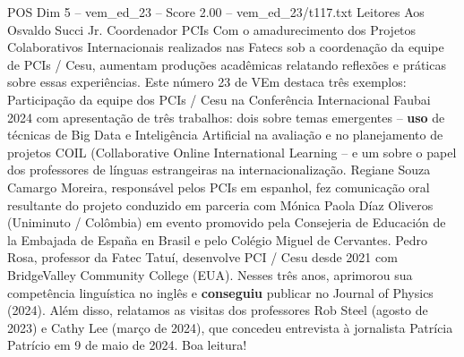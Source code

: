 \begin{textsample}{POS Dim 5 – vem\_ed\_23 – Score 2.00 – vem\_ed\_23/t117.txt}  \label{ex:f5_pos_065}
Leitores Aos Osvaldo Succi Jr.
Coordenador PCIs Com o amadurecimento dos Projetos Colaborativos Internacionais realizados nas Fatecs sob a coordenação da equipe de PCIs / Cesu, aumentam produções acadêmicas relatando reflexões e práticas sobre essas experiências.
Este número 23 de VEm destaca três exemplos: Participação da equipe dos PCIs / Cesu na Conferência Internacional Faubai 2024 com apresentação de três trabalhos: dois sobre temas emergentes – \textbf{uso} de técnicas de Big Data e Inteligência Artificial na avaliação e no planejamento de projetos COIL (Collaborative Online International Learning – e um sobre o papel dos professores de línguas estrangeiras na internacionalização.
Regiane Souza Camargo Moreira, responsável pelos PCIs em espanhol, fez comunicação oral resultante do projeto conduzido em parceria com Mónica Paola Díaz Oliveros (Uniminuto / Colômbia) em evento promovido pela Consejeria de Educación de la Embajada de España en Brasil e pelo Colégio Miguel de Cervantes.
Pedro Rosa, professor da Fatec Tatuí, desenvolve PCI / Cesu desde 2021 com BridgeValley Community College (EUA).
Nesses três anos, aprimorou sua competência linguística no inglês e \textbf{conseguiu} publicar no Journal of Physics (2024).
Além disso, relatamos as visitas dos professores Rob Steel (agosto de 2023) e Cathy Lee (março de 2024), que concedeu entrevista à jornalista Patrícia Patrício em 9 de maio de 2024.
Boa leitura!

\end{textsample}
